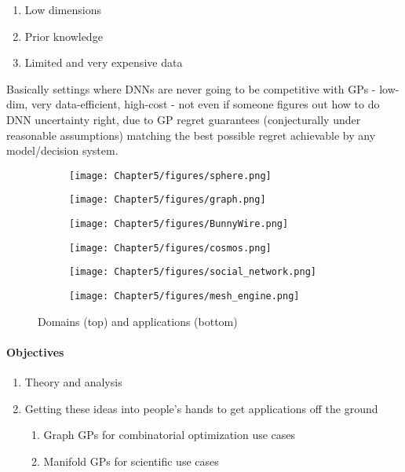 \begin{enumerate}
    \item Low dimensions
    \item Prior knowledge
    \item Limited and very expensive data
\end{enumerate}

Basically settings where DNNs are never going to be competitive with GPs - low-dim, very data-efficient, high-cost - not even if someone figures out how to do DNN uncertainty right, due to GP regret guarantees (conjecturally under reasonable assumptions) matching the best possible regret achievable by any model/decision system.

\begin{figure}[htb]
    \centering %
\begin{subfigure}{0.25\textwidth}
  \texttt{[image: Chapter5/figures/sphere.png]}
  \label{fig:1}
\end{subfigure}\hfil %
\begin{subfigure}{0.25\textwidth}
  \texttt{[image: Chapter5/figures/graph.png]}
  \label{fig:2}
\end{subfigure}\hfil %
\begin{subfigure}{0.25\textwidth}
  \texttt{[image: Chapter5/figures/BunnyWire.png]}
  \label{fig:3}
\end{subfigure}

\medskip
\begin{subfigure}{0.25\textwidth}
  \texttt{[image: Chapter5/figures/cosmos.png]}
  \label{fig:4}
\end{subfigure}\hfil %
\begin{subfigure}{0.25\textwidth}
  \texttt{[image: Chapter5/figures/social\_network.png]}
  \label{fig:5}
\end{subfigure}\hfil %
\begin{subfigure}{0.25\textwidth}
  \texttt{[image: Chapter5/figures/mesh\_engine.png]}
  \label{fig:6}
\end{subfigure}
\caption{Domains (top) and applications (bottom)}
\label{fig:images}
\end{figure}

\paragraph{Objectives}
\begin{enumerate}
    \item Theory and analysis
    \item Getting these ideas into people's hands to get applications off the ground
    \begin{enumerate}
        \item Graph GPs for combinatorial optimization use cases
        \item Manifold GPs for scientific use cases
    \end{enumerate}
\end{enumerate}

